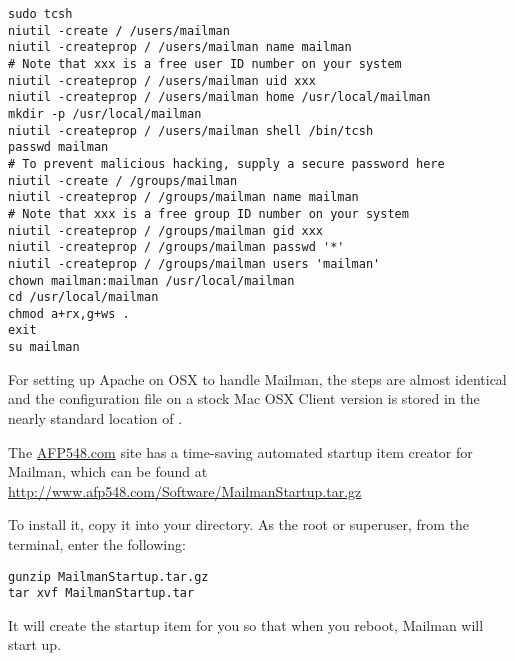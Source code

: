 \documentclass{howto}
\begin{document}
\begin{verbatim}
sudo tcsh
niutil -create / /users/mailman
niutil -createprop / /users/mailman name mailman
# Note that xxx is a free user ID number on your system
niutil -createprop / /users/mailman uid xxx
niutil -createprop / /users/mailman home /usr/local/mailman
mkdir -p /usr/local/mailman
niutil -createprop / /users/mailman shell /bin/tcsh
passwd mailman
# To prevent malicious hacking, supply a secure password here
niutil -create / /groups/mailman
niutil -createprop / /groups/mailman name mailman
# Note that xxx is a free group ID number on your system
niutil -createprop / /groups/mailman gid xxx
niutil -createprop / /groups/mailman passwd '*'
niutil -createprop / /groups/mailman users 'mailman'
chown mailman:mailman /usr/local/mailman
cd /usr/local/mailman
chmod a+rx,g+ws .
exit
su mailman
\end{verbatim}

For setting up Apache on OSX to handle Mailman, the steps are almost identical
and the configuration file on a stock Mac OSX Client version is stored in the
nearly standard location of .

The \url{AFP548.com} site has a time-saving automated startup item creator for
Mailman, which can be found at 
\url{http://www.afp548.com/Software/MailmanStartup.tar.gz}

To install it, copy it into your  directory. As
the root or superuser, from the terminal, enter the following:

\begin{verbatim}
gunzip MailmanStartup.tar.gz
tar xvf MailmanStartup.tar
\end{verbatim}

It will create the startup item for you so that when you reboot, Mailman will
start up.
\end{document}
